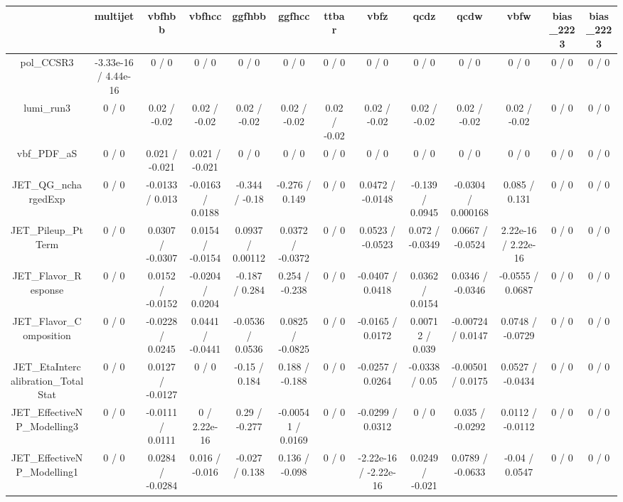 \documentclass[10pt]{article}
\begin{document}
\begin{table}[htbp]
\begin{center}
\begin{tabular}{|c|c|c|c|c|c|c|c|c|c|c|c|c|}
\hline 
      & multijet      & vbfhbb      & vbfhcc      & ggfhbb      & ggfhcc      & ttbar      & vbfz      & qcdz      & qcdw      & vbfw      & bias_2223      & bias_2223 \\ 
\hline 
  pol_CCSR3 & -3.33e-16 / 4.44e-16 & 0 / 0 & 0 / 0 & 0 / 0 & 0 / 0 & 0 / 0 & 0 / 0 & 0 / 0 & 0 / 0 & 0 / 0 & 0 / 0 & 0 / 0 \\ 
  lumi_run3 & 0 / 0 & 0.02 / -0.02 & 0.02 / -0.02 & 0.02 / -0.02 & 0.02 / -0.02 & 0.02 / -0.02 & 0.02 / -0.02 & 0.02 / -0.02 & 0.02 / -0.02 & 0.02 / -0.02 & 0 / 0 & 0 / 0 \\ 
  vbf_PDF_aS & 0 / 0 & 0.021 / -0.021 & 0.021 / -0.021 & 0 / 0 & 0 / 0 & 0 / 0 & 0 / 0 & 0 / 0 & 0 / 0 & 0 / 0 & 0 / 0 & 0 / 0 \\ 
  JET_QG_nchargedExp & 0 / 0 & -0.0133 / 0.013 & -0.0163 / 0.0188 & -0.344 / -0.18 & -0.276 / 0.149 & 0 / 0 & 0.0472 / -0.0148 & -0.139 / 0.0945 & -0.0304 / 0.000168 & 0.085 / 0.131 & 0 / 0 & 0 / 0 \\ 
  JET_Pileup_PtTerm & 0 / 0 & 0.0307 / -0.0307 & 0.0154 / -0.0154 & 0.0937 / 0.00112 & 0.0372 / -0.0372 & 0 / 0 & 0.0523 / -0.0523 & 0.072 / -0.0349 & 0.0667 / -0.0524 & 2.22e-16 / 2.22e-16 & 0 / 0 & 0 / 0 \\ 
  JET_Flavor_Response & 0 / 0 & 0.0152 / -0.0152 & -0.0204 / 0.0204 & -0.187 / 0.284 & 0.254 / -0.238 & 0 / 0 & -0.0407 / 0.0418 & 0.0362 / 0.0154 & 0.0346 / -0.0346 & -0.0555 / 0.0687 & 0 / 0 & 0 / 0 \\ 
  JET_Flavor_Composition & 0 / 0 & -0.0228 / 0.0245 & 0.0441 / -0.0441 & -0.0536 / 0.0536 & 0.0825 / -0.0825 & 0 / 0 & -0.0165 / 0.0172 & 0.00712 / 0.039 & -0.00724 / 0.0147 & 0.0748 / -0.0729 & 0 / 0 & 0 / 0 \\ 
  JET_EtaIntercalibration_TotalStat & 0 / 0 & 0.0127 / -0.0127 & 0 / 0 & -0.15 / 0.184 & 0.188 / -0.188 & 0 / 0 & -0.0257 / 0.0264 & -0.0338 / 0.05 & -0.00501 / 0.0175 & 0.0527 / -0.0434 & 0 / 0 & 0 / 0 \\ 
  JET_EffectiveNP_Modelling3 & 0 / 0 & -0.0111 / 0.0111 & 0 / 2.22e-16 & 0.29 / -0.277 & -0.00541 / 0.0169 & 0 / 0 & -0.0299 / 0.0312 & 0 / 0 & 0.035 / -0.0292 & 0.0112 / -0.0112 & 0 / 0 & 0 / 0 \\ 
  JET_EffectiveNP_Modelling1 & 0 / 0 & 0.0284 / -0.0284 & 0.016 / -0.016 & -0.027 / 0.138 & 0.136 / -0.098 & 0 / 0 & -2.22e-16 / -2.22e-16 & 0.0249 / -0.021 & 0.0789 / -0.0633 & -0.04 / 0.0547 & 0 / 0 & 0 / 0 \\ 

\end{tabular}
\end{center}
\end{table}
\end{document}
